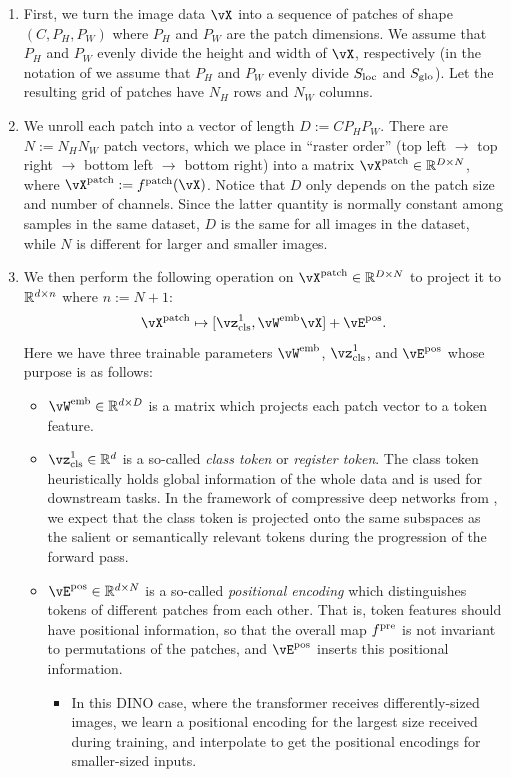 \documentclass[../../book-main.tex]{subfiles}
\begin{document}
\begin{enumerate}
    \item First, we turn the image data \(\vX\) into a sequence of patches of shape \((C, P_{H}, P_{W})\) where \(P_{H}\) and \(P_{W}\) are the patch dimensions. We assume that \(P_{H}\) and \(P_{W}\) evenly divide the height and width of \(\vX\), respectively (in the notation of  we assume that \(P_{H}\) and \(P_{W}\) evenly divide \(S_{\mathrm{loc}}\) and \(S_{\mathrm{glo}}\)). Let the resulting grid of patches have \(N_{H}\) rows and \(N_{W}\) columns.
    \item We unroll each patch into a vector of length \(D := CP_{H}P_{W}\). There are \(N := N_{H}N_{W}\) patch vectors, which we place in ``raster order'' (top left \(\to\) top right \(\to\) bottom left \(\to\) bottom right) into a matrix \(\vX^{\patch} \in \R^{D \times N}\), where \(\vX^{\patch} := f^{\patch}(\vX)\). Notice that \(D\) only depends on the patch size and number of channels. Since the latter quantity is normally constant among samples in the same dataset, \(D\) is the same for all images in the dataset, while \(N\) is different for larger and smaller images.
    \item We then perform the following operation on \(\vX^{\patch} \in \R^{D \times N}\) to project it to \(\mathbb{R}^{d \times n}\) where \(n := N + 1\):
    \begin{equation}
        \vX^{\patch} \mapsto [\vz_{\cls}^{1}, \vW^{\emb}\vX] + \vE^{\pos}.
    \end{equation}
    Here we have three trainable parameters \(\vW^{\emb}\), \(\vz_{\cls}^{1}\), and \(\vE^{\pos}\) whose purpose is as follows:
    \begin{itemize}
        \item \(\vW^{\emb} \in \R^{d \times D}\) is a matrix which projects each patch vector to a token feature.
        \item \(\vz_{\cls}^{1} \in \R^{d}\) is a so-called \textit{class token} or \textit{register token}. The class token heuristically holds global information of the whole data and is used for downstream tasks. In the framework of compressive deep networks from , we expect that the class token is projected onto the same subspaces as the salient or semantically relevant tokens during the progression of the forward pass.
        \item \(\vE^{\pos} \in \R^{d \times N}\) is a so-called \textit{positional encoding} which distinguishes tokens of different patches from each other. That is, token features should have positional information, so that the overall map \(f^{\mathrm{pre}}\) is not invariant to permutations of the patches, and \(\vE^{\pos}\) inserts this positional information. 
        \begin{itemize}
            \item In this DINO case, where the transformer receives differently-sized images, we learn a positional encoding for the largest size received during training, and interpolate to get the positional encodings for smaller-sized inputs.
        \end{itemize}
    \end{itemize}
\end{enumerate}
\end{document}
